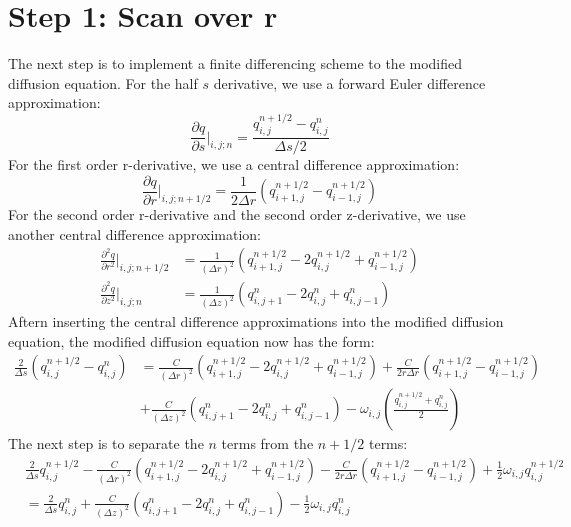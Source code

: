 \documentclass[11pt]{article} %
\begin{document}
\section*{Step 1: Scan over r}
The next step is to implement a finite differencing scheme to the modified diffusion equation.  For the half $s$ derivative, we use a forward Euler difference approximation:
\begin{equation}
\frac{\partial q}{\partial s} \Big|_{i,j;n} = \dfrac{q_{i,j}^{n+1/2} - q_{i,j}^n}{\Delta s/2}
\end{equation}
\noindent
For the first order r-derivative, we use a central difference approximation:
\begin{equation}
\frac{\partial q}{\partial r} \Big|_{i,j;n+1/2} = \frac{1}{2\Delta r} \left( q_{i+1,j}^{n+1/2} - q_{i-1,j}^{n+1/2} \right)
\end{equation}
\noindent
For the second order r-derivative and the second order z-derivative, we use another central difference approximation:
\begin{align}
\frac{\partial^2 q}{\partial r^2} \Big|_{i,j;n+1/2} &= \frac{1}{(\Delta r)^2} \left( q_{i+1,j}^{n+1/2} -2q_{i,j}^{n+1/2} + q_{i-1,j}^{n+1/2} \right) \\
\frac{\partial^2 q}{\partial z^2} \Big|_{i,j;n} &= \frac{1}{(\Delta z)^2} \left( q_{i,j+1}^{n} -2q_{i,j}^n+ q_{i,j-1}^n \right)
\end{align}
\noindent
Aftern inserting the central difference approximations into the modified diffusion equation, the modified diffusion equation now has the form:
\begin{align}
\frac{2}{\Delta s} (q_{i,j}^{n+1/2} - q_{i,j}^n) &=  \frac{C}{(\Delta r)^2} \left( q_{i+1,j}^{n+1/2} -2q_{i,j}^{n+1/2} + q_{i-1,j}^{n+1/2} \right) +  \frac{C}{2r\Delta r} \left( q_{i+1,j}^{n+1/2} - q_{i-1,j}^{n+1/2} \right) \\
&+ \frac{C}{(\Delta z)^2} \left( q_{i,j+1}^{n} -2q_{i,j}^n+ q_{i,j-1}^n \right)  - \omega_{i,j} \left( \frac{q_{i,j}^{n+1/2} + q_{i,j}^{n}}{2} \right)
\end{align}
\noindent
The next step is to separate the $n$ terms from the $n+1/2$ terms:
\begin{align}
&\frac{2}{\Delta s}q_{i,j}^{n+1/2}  - \frac{C}{(\Delta r)^2} \left( q_{i+1,j}^{n+1/2} -2q_{i,j}^{n+1/2} + q_{i-1,j}^{n+1/2} \right) - \frac{C}{2r\Delta r} \left( q_{i+1,j}^{n+1/2} - q_{i-1,j}^{n+1/2} \right)  + \frac{1}{2} \omega_{i,j} q_{i,j}^{n+1/2} \\
& = \frac{2}{\Delta s} q_{i,j}^n  + \frac{C}{(\Delta z)^2} \left( q_{i,j+1}^{n} -2q_{i,j}^n+ q_{i,j-1}^n \right) - \frac{1}{2} \omega_{i,j} q_{i,j}^{n} 
\end{align}
\end{document}
